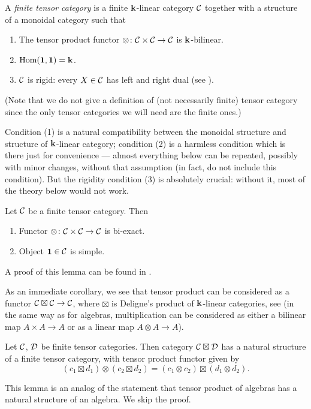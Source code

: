 \begin{definition}\label{d:finite-tensor}
  A \emph{finite tensor category} is a finite $\mathbf{k}$-linear category $\mathcal{C}$
  together with a structure of a monoidal category such that
  \begin{enumerate}
    \item The tensor product functor $\otimes\colon
     \mathcal{C}\times \mathcal{C}\to \mathcal{C}$ is $\mathbf{k}$-bilinear.
    \item $\operatorname{Hom}(\mathbf{1}, \mathbf{1})=\mathbf{k}$.
    \item $\mathcal{C}$ is rigid: every $X\in \mathcal{C}$ has left and right dual (see
      ).
  \end{enumerate}
\end{definition}
(Note that we do not give a definition of (not necessarily finite) tensor
category since the only tensor categories we will need are the finite ones.)

Condition (1) is a natural compatibility between the monoidal structure and
structure of $\mathbf{k}$-linear category; condition (2) is a harmless condition which
is there just for convenience --- almost everything below can be repeated,
possibly with minor changes, without that assumption (in fact,
\cite{dsps-balanced} do not include this condition). But the rigidity condition
(3) is absolutely crucial: without it, most of the theory below would not work.


\begin{lemma}\label{l:tensor-biexact}
  Let $\mathcal{C}$ be a finite tensor category. Then
  \begin{enumerate}
    \item Functor $\otimes \colon \mathcal{C}\times \mathcal{C}\to \mathcal{C}$ is bi-exact.
    \item Object $\mathbf{1}\in \mathcal{C}$ is simple.
  \end{enumerate}
\end{lemma}
A proof of this lemma can be found in \cite[Proposition
4.2.1, Theorem 4.3.8]{etingof-fusion}.

As an immediate corollary, we see that tensor product can be considered as a
functor $\mathcal{C}\boxtimes \mathcal{C}\to \mathcal{C}$, where $\boxtimes$ is Deligne's product
of $\mathbf{k}$-linear categories, see  (in the same way as
for algebras, multiplication can be considered as either a bilinear map $A\times
A\to A$ or as a linear map $A\otimes A\to A$).

\begin{lemma}\label{l:tensor-boxtimes}
  Let $\mathcal{C}$, $\mathcal{D}$ be finite tensor categories. Then category
  $\mathcal{C}\boxtimes \mathcal{D}$ has a natural structure of a finite tensor category,
  with tensor product functor given by
  $$
  (c_1 \boxtimes d_1)\otimes (c_2\boxtimes d_2)
    = (c_1\otimes c_2)\boxtimes (d_1\otimes d_2).
  $$
\end{lemma}
This lemma is an analog of the statement that tensor product of algebras has a
natural structure of an algebra. We skip the proof.

